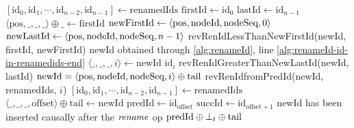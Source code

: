 \begin{algorithm}[!ht]
  \footnotesize
  \begin{algorithmic}[1]

        \Statex
        \State $[\text{id}_0, \text{id}_1, \cdots, \text{id}_{n-2}, \text{id}_{n-1}] \leftarrow \text{renamedIds}$
        \State $\text{firstId} \gets \text{id}_0$
        \State $\text{lastId} \gets \text{id}_{n - 1}$
        \State $\langle \text{pos}, \_, \_, \_ \rangle \oplus \text{\_} \leftarrow \text{firstId}$
        \State $\text{newFirstId} \gets \langle \text{pos},\text{nodeId},\text{nodeSeq},0 \rangle$
        \State $\text{newLastId} \gets \langle \text{pos},\text{nodeId},\text{nodeSeq},n-1 \rangle$
        \Statex
          \State \Return revRenIdLessThanNewFirstId(newId, firstId, newFirstId)
            \label{alg:revertRenameId-in-former-state}
            \Statex \Comment newId obtained through \autoref{alg:renameId}, line \ref{alg:renameId-id-in-renamedids-end}
            \State $\langle \_,\_,\_,i \rangle \leftarrow \text{newId}$
            \State \Return $\text{id}_i$ \label{alg:revertRenameId-case-i}
            \State \Return revRenIdGreaterThanNewLastId(newId, lastId)
        \Else
            \Statex \Comment $\text{newId} = \langle \text{pos},\text{nodeId},\text{nodeSeq},{i} \rangle \oplus \text{tail}$
            \State \Return revRenIdfromPredId(newId, renamedIds, $i$)
        \EndIf
    \EndFunction
    \Statex
        \Statex
        \State $[\text{id}_0, \text{id}_1, \cdots, \text{id}_{n-2}, \text{id}_{n-1}] \leftarrow \text{renamedIds}$
        \State $\langle \_,\_,\_, \text{offset} \rangle \oplus \text{tail} \leftarrow \text{newId}$ \label{alg:revertRenameId-offset}
        \State $\text{predId} \gets \text{id}_{\text{offset}}$ \label{alg:revertRenameId-predId}
        \State $\text{succId} \gets \text{id}_{\text{offset}+1}$ \label{alg:revertRenameId-succId}
        \Statex
            \Statex \Comment newId has been inserted causally after the $\mathit{rename}$ op
            \State \Return $\text{predId} \oplus \bot_t \oplus \text{tail}$ \Comment \commentbott \label{alg:revertRenameId-case-iii-min-tuple}

\end{algorithmic}
\end{algorithm}
